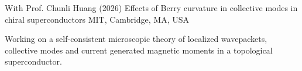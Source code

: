

\begin{cventries}
	
	\cventry
	{With Prof. Chunli Huang (2026)} %
	{Effects of Berry curvature in collective modes in chiral superconductors} %
	{MIT, Cambridge, MA, USA} %
	{} %
	{
		\begin{cvitems} %
			\item{Working on a self-consistent microscopic theory of localized wavepackets, collective modes and current generated magnetic moments in a topological superconductor.}
		\end{cvitems}
	}
	

\end{cventries}
